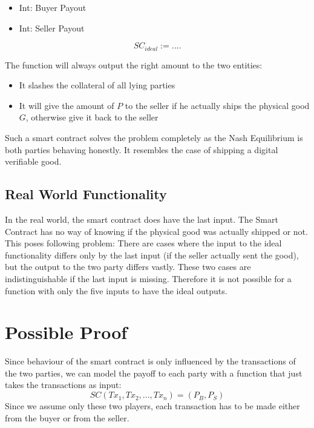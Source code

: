 \documentclass{cacthesis}
\begin{document}
\begin{itemize}
\item{Int: Buyer Payout}
\item{Int: Seller Payout}
\end{itemize}

\begin{equation}
	SC_{ideal}:= ....	
\end{equation}

The function will always output the right amount to the two entities:
\begin{itemize}
    \item It slashes the collateral of all lying parties
    \item It will give the amount of $P$ to the seller if he actually ships the physical good $G$, otherwise give it back to the seller
\end{itemize}

Such a smart contract solves the problem completely as the Nash Equilibrium is both parties behaving honestly.%
It resembles the case of shipping a digital verifiable good. %

\subsection{Real World Functionality}
In the real world, the smart contract does have the last input. The Smart Contract has no way of knowing if the physical good was actually shipped or not. \newline
This poses following problem: There are cases where the input to the ideal functionality differs only by the last input (if the seller actually sent the good), but the output to the two party differs vastly. These two cases are indistinguishable if the last input is missing. Therefore it is not possible for a function with only the five inputs to have the ideal outputs.

\section{Possible Proof}
Since behaviour of the smart contract is only influenced by the transactions of the two parties, we can model the payoff to each party with a function that just takes the transactions as input:
\begin{equation}
    SC(Tx_1, Tx_2,...,Tx_n) = (P_B, P_S)
\end{equation}
Since we assume only these two players, each transaction has to be made either from the buyer or from the seller.\newline
\end{document}
